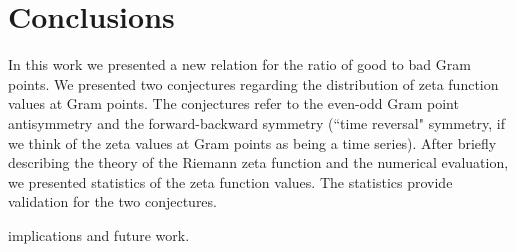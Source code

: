 \documentclass[twoside]{article}
\theoremstyle{definition}
\begin{document}
\section{\label{conclusions}Conclusions}

In this work we presented a new  relation for the ratio of good to bad Gram points. We presented two conjectures regarding the distribution of zeta function values at Gram points. The conjectures refer to the even-odd Gram point antisymmetry and the forward-backward symmetry (``time reversal" symmetry, if we think of the zeta values at Gram points as being a time series). After briefly describing the theory of the Riemann zeta function and the numerical evaluation, we presented statistics of the zeta function values. The statistics provide validation for the two conjectures.

implications and future work.
\end{document}
